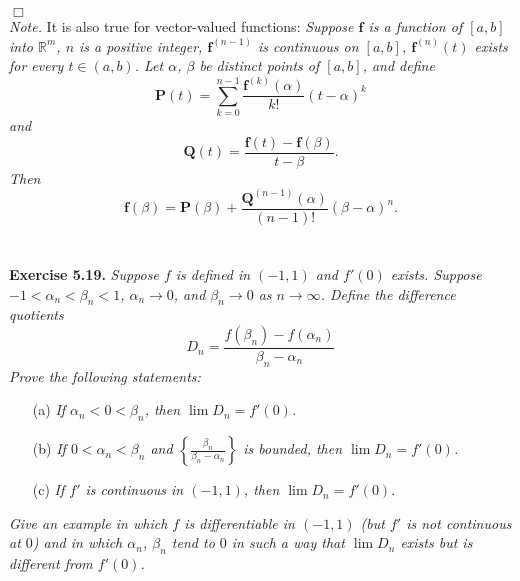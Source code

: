 \documentclass{article}
\begin{document}
$\Box$ \\

\emph{Note.}
It is also true for vector-valued functions:
  \emph{Suppose $\mathbf{f}$ is a function of $[a,b]$ into $\mathbb{R}^{m}$,
  $n$ is a positive integer,
  $\mathbf{f}^{(n-1)}$ is continuous on $[a,b]$,
  $\mathbf{f}^{(n)}(t)$ exists for every $t \in (a,b)$.
  Let $\alpha$, $\beta$ be distinct points of $[a,b]$, and define
  \[
    \mathbf{P}(t) = \sum_{k=0}^{n-1} \frac{\mathbf{f}^{(k)}(\alpha)}{k!}(t - \alpha)^k
  \]
  and
  \[
    \mathbf{Q}(t) = \frac{\mathbf{f}(t) - \mathbf{f}(\beta)}{t - \beta}.
  \]
  Then
  \[
    \mathbf{f}(\beta) = \mathbf{P}(\beta)
      + \frac{\mathbf{Q}^{(n-1)}(\alpha)}{(n-1)!} (\beta - \alpha)^n.
  \]} \\\\






\textbf{Exercise 5.19.}
\emph{Suppose $f$ is defined in $(-1,1)$ and $f'(0)$ exists.
Suppose $-1 < \alpha_n < \beta_n < 1$, $\alpha_n \to 0$,
and $\beta_n \to 0$ as $n \to \infty$.
Define the difference quotients
\[
  D_n = \frac{f(\beta_n) - f(\alpha_n)}{\beta_n - \alpha_n}
\]
Prove the following statements:}
\begin{enumerate}
  \item[(a)]
  \emph{If $\alpha_n < 0 < \beta_n$, then $\lim{D_n} = f'(0)$.}

  \item[(b)]
  \emph{If $0 < \alpha_n < \beta_n$ and $\left\{\frac{\beta_n}{\beta_n-\alpha_n}\right\}$ is bounded,
  then $\lim{D_n} = f'(0)$.}

  \item[(c)]
  \emph{If $f'$ is continuous in $(-1,1)$, then $\lim{D_n} = f'(0)$}.
\end{enumerate}
\emph{Give an example in which $f$ is differentiable in $(-1,1)$
(but $f'$ is not continuous at $0$) and in which
$\alpha_n$, $\beta_n$ tend to $0$ in such a way that $\lim{D_n}$ exists
but is different from $f'(0)$.} \\
\end{document}
